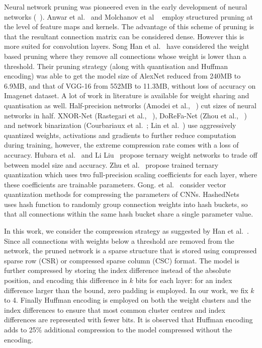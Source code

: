 Neural network pruning was pioneered even in the early development of neural networks (~\cite{Reed93}).
Anwar et  al.~\cite{AnwarHS17} and Molchanov et  al ~\cite{MolchanovTKAK16} employ structured pruning  at the level of feature maps and kernels. The advantage of this 
scheme of pruning is that the resultant connection matrix can be considered dense. However this is more suited for 
convolution layers. Song Han et  al.~\cite{HanMD15} have considered the weight based pruning where they remove all connections whose weight is lower than a threshold. 
Their pruning strategy (along with quantisation and Huffman encoding) was able to get the model size of AlexNet reduced  from 240MB to 6.9MB, 
and that of VGG-16 from 552MB to 11.3MB, without loss of accuracy on Imagenet dataset.
A lot of work in literature is available for weight sharing and quantisation as well. 
Half-precision networks (Amodei et al., ~\cite{AmodeiABCCCCCCD15}) cut sizes of neural networks in half. XNOR-Net (Rastegari et al., ~\cite{RastegariORF16}), 
DoReFa-Net (Zhou et al., ~\cite{ZhouNZWWZ16}) and network binarization (Courbariaux et al.~\cite{CourbariauxB16}; Lin et al.~\cite{LinCMB15}) use aggressively quantized weights, activations and gradients to further reduce computation during training, however, the extreme compression rate comes with a loss of accuracy. Hubara et al.~\cite{HubaraCSEB16} and Li  Liu~\cite{LiL16} propose ternary weight networks to trade off between model size and accuracy.
Zhu et  al.~\cite{ZhuHMD16}  propose trained ternary quantization which uses two full-precision scaling coefficients for each layer, where these coefficients are trainable parameters.
Gong. et  al.~\cite{GongLYB14} consider vector quantization methods for compressing the parameters of CNNs.
HashedNets~\cite{ChenWTWC15} uses hash function to randomly group connection weights into hash buckets, so that all connections within the same hash bucket share a single parameter value. 


In this work,  we consider the compression strategy as suggested by  Han et  al.~\cite{HanMD15, HanPTD15}. Since 
all connections with weights below a threshold are removed from the network, the pruned network is a 
sparse structure that is stored using compressed sparse row (CSR) or compressed sparse column (CSC) format.
The model is further compressed by storing the  index difference instead of the absolute position, and encoding this difference in 
$k$ bits for each layer: for an index difference larger than the bound,  zero padding is employed. In our work, we fix $k$ to 4.
Finally Huffman encoding is employed on both the weight clusters and the index differences to ensure that most common cluster centres and  index differences
are represented with fewer bits. It is observed that Huffman encoding adds to 25\% additional
compression to the  model compressed without the encoding.  

